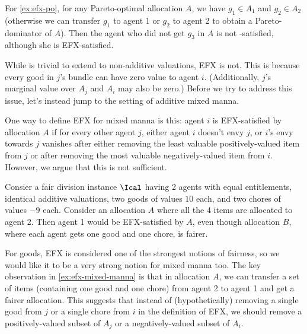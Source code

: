 For \cref{ex:efx-po}, for any Pareto-optimal allocation $A$, we have $g_1 \in A_1$ and $g_2 \in A_2$
(otherwise we can transfer $g_1$ to agent 1 or $g_2$ to agent 2 to obtain a Pareto-dominator of $A$).
Then the agent who did not get $g_3$ in $A$ is not \EFXZero-satisfied, although she is EFX-satisfied.

While \EFXZero{} is trivial to extend to non-additive valuations, EFX is not.
This is because every good in $j$'s bundle can have zero value to agent $i$.
(Additionally, $j$'s marginal value over $A_j$ and $A_i$ may also be zero.)
Before we try to address this issue, let's instead jump to the setting of additive mixed manna.

One way to define EFX for mixed manna is this:
agent $i$ is EFX-satisfied by allocation $A$ if for every other agent $j$,
either agent $i$ doesn't envy $j$, or $i$'s envy towards $j$ vanishes after
either removing the least valuable positively-valued item from $j$
or after removing the most valuable negatively-valued item from $i$.
However, we argue that this is not sufficient.

\begin{example}
\label{ex:efx-mixed-manna}
Consier a fair division instance $\Ical$ having 2 agents with equal entitlements,
identical additive valuations, two goods of values $10$ each,
and two chores of values $-9$ each.
Consider an allocation $A$ where all the 4 items are allocated to agent 2.
Then agent 1 would be EFX-satisfied by $A$, even though allocation $B$,
where each agent gets one good and one chore, is fairer.
\end{example}

For goods, EFX is considered one of the strongest notions of fairness,
so we would like it to be a very strong notion for mixed manna too.
The key observation in \cref{ex:efx-mixed-manna} is that in allocation $A$,
we can transfer a set of items (containing one good and one chore) from agent 2 to agent 1
and get a fairer allocation.
This suggests that instead of (hypothetically) removing a single good from $j$
or a single chore from $i$ in the definition of EFX,
we should remove a positively-valued subset of $A_j$
or a negatively-valued subset of $A_i$.

